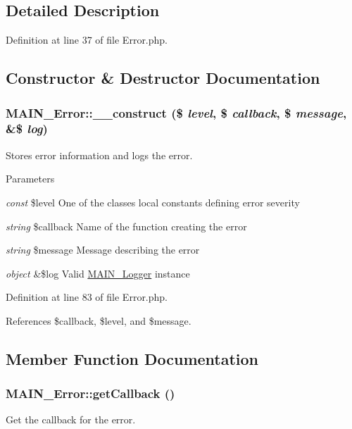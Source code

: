 \subsection{Detailed Description}


Definition at line 37 of file Error.php.

\subsection{Constructor \& Destructor Documentation}
\hypertarget{classMAIN__Error_a9cc959e84c15f51a4a843cbe43f24dfc}{
\subsubsection[{\_\-\_\-construct}]{\setlength{\rightskip}{0pt plus 5cm}MAIN\_\-Error::\_\-\_\-construct (\$ {\em level}, \/  \$ {\em callback}, \/  \$ {\em message}, \/  \&\$ {\em log})}}
\label{d4/d5e/classMAIN__Error_a9cc959e84c15f51a4a843cbe43f24dfc}
Stores error information and logs the error.


\begin{DoxyParams}{Parameters}
\item[{\em const}]\$level One of the classes local constants defining error severity \item[{\em string}]\$callback Name of the function creating the error \item[{\em string}]\$message Message describing the error \item[{\em object}]\&\$log Valid \hyperlink{classMAIN__Logger}{MAIN\_\-Logger} instance \end{DoxyParams}


Definition at line 83 of file Error.php.

References \$callback, \$level, and \$message.

\subsection{Member Function Documentation}
\hypertarget{classMAIN__Error_a1c55316aa04e3a3b938466aa65579849}{
\subsubsection[{getCallback}]{\setlength{\rightskip}{0pt plus 5cm}MAIN\_\-Error::getCallback ()}}
\label{d4/d5e/classMAIN__Error_a1c55316aa04e3a3b938466aa65579849}
Get the callback for the error.

